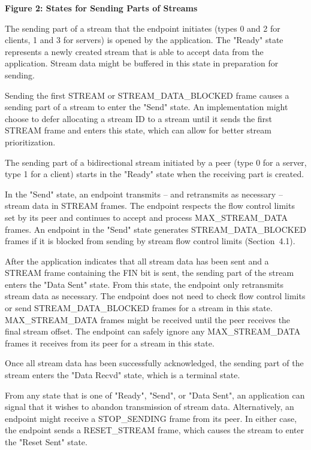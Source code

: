 \documentclass{article}
\begin{document}
\begin{center}
\textbf{Figure 2: States for Sending Parts of Streams}
\end{center}

The sending part of a stream that the endpoint initiates (types 0 and 2 for clients, 1 and 3 for servers) is opened by the application. The "Ready" state represents a newly created stream that is able to accept data from the application.  Stream data might be buffered in this state in preparation for sending.

Sending the first STREAM or STREAM\_DATA\_BLOCKED frame causes a sending part of a stream to enter the "Send" state.  An implementation might choose to defer allocating a stream ID to a stream until it sends the first STREAM frame and enters this state, which can allow for better stream prioritization.

The sending part of a bidirectional stream initiated by a peer (type 0 for a server, type 1 for a client) starts in the "Ready" state when the receiving part is created.

In the "Send" state, an endpoint transmits -- and retransmits as necessary -- stream data in STREAM frames.  The endpoint respects the flow control limits set by its peer and continues to accept and process MAX\_STREAM\_DATA frames.  An endpoint in the "Send" state generates STREAM\_DATA\_BLOCKED frames if it is blocked from sending by stream flow control limits (Section~4.1).

After the application indicates that all stream data has been sent and a STREAM frame containing the FIN bit is sent, the sending part of the stream enters the "Data Sent" state.  From this state, the endpoint only retransmits stream data as necessary.  The endpoint does not need to check flow control limits or send STREAM\_DATA\_BLOCKED frames for a stream in this state. MAX\_STREAM\_DATA frames might be received until the peer receives the final stream offset.  The endpoint can safely ignore any MAX\_STREAM\_DATA frames it receives from its peer for a stream in this state.

Once all stream data has been successfully acknowledged, the sending part of the stream enters the "Data Recvd" state, which is a terminal state.

From any state that is one of "Ready", "Send", or "Data Sent", an application can signal that it wishes to abandon transmission of stream data.  Alternatively, an endpoint might receive a STOP\_SENDING frame from its peer.  In either case, the endpoint sends a RESET\_STREAM frame, which causes the stream to enter the "Reset Sent" state.
\end{document}
